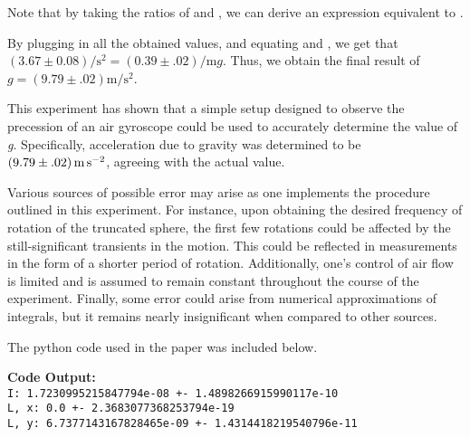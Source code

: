 \begin{paper}
Note that by taking the ratios of \eqL and \eqI, we can derive an expression equivalent to \eqR.


By plugging in all the obtained values, and equating \eqR and \eqS, we get that
$(3.67\pm0.08)\si{\per\second\squared}=(0.39\pm.02)\si{\per\metre}g$.
Thus, we obtain the final result of $g=(9.79\pm.02)\si{\metre\per\second\squared}$.


	This experiment has shown that a simple setup designed to observe the precession of an air gyroscope could be used to accurately determine the value of \textit{g}. Specifically, acceleration due to gravity was determined to be \( \left(9.79 \pm .02\right) \si{\metre\per\second\squared} \), agreeing with the actual value.
	
	Various sources of possible error may arise as one implements the procedure outlined in this experiment. For instance, upon obtaining the desired frequency of rotation of the truncated sphere, the first few rotations could be affected by the still-significant transients in the motion. This could be reflected in measurements in the form of a shorter period of rotation. Additionally, one's control of air flow is limited and is assumed to remain constant throughout the course of the experiment. Finally, some error could arise from numerical approximations of integrals, but it remains nearly insignificant when compared to other sources. 
	



The python code used in the paper was included below.

\end{paper}

\vspace{1em}

\noindent\textbf{Code Output:}\\
\texttt{I: 1.7230995215847794e-08 +- 1.4898266915990117e-10\\
L, x: 0.0 +- 2.3683077368253794e-19\\
L, y: 6.7377143167828465e-09 +- 1.4314418219540796e-11}
